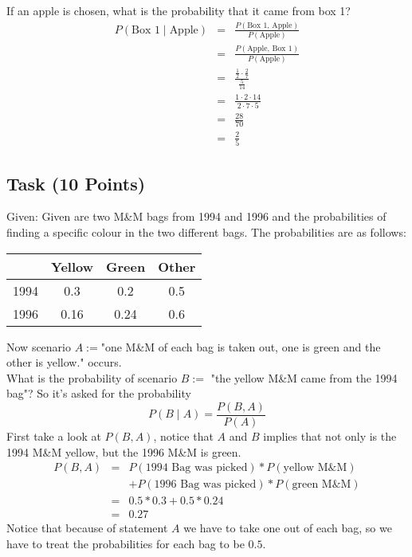 \documentclass{article}
\begin{document}
	If an apple is chosen, what is the probability that it came from box 1?\\
	\begin{eqnarray*}
		P(\text{Box 1} \mid \text{Apple}) &=& \frac{P(\text{Box 1, Apple})}{P(\text{Apple})}\\
		&=& \frac{P(\text{Apple, Box 1})}{P(\text{Apple})}\\
		&=& \frac{\frac{1}{2} \cdot \frac{2}{7}}{\frac{5}{14}}\\
		&=& \frac{1 \cdot 2 \cdot 14}{2 \cdot 7 \cdot 5}\\
		&=& \frac{28}{70}\\
		&=& \frac{2}{5}
	\end{eqnarray*}

	\subsection{Task (10 Points)}
	Given: Given are two M\&M bags from 1994 and 1996 and the probabilities of finding a specific colour in the two different bags. The probabilities are as follows:
	\begin{center}
		\begin{tabular}{ |c|c|c|c| }
			\hline
			& Yellow & Green & Other \\ 
			\hline
			1994 & 0.3 & 0.2 & 0.5 \\ 
			\hline
			1996 & 0.16 & 0.24 & 0.6 \\ 
			\hline
		\end{tabular}
	\end{center}
	Now scenario $A := $"one M\&M of each bag is taken out, one is green and the other is yellow." occurs.\\
	What is the probability of scenario $B := $ "the yellow M\&M came from the 1994 bag"?
	So it's asked for the probability 
	\begin{equation*}
		P(B \mid A) = \frac{P(B, A)}{P(A)}
	\end{equation*}
	First take a look at $P(B, A)$, notice that $A$ and $B$ implies that not only is the 1994 M\&M yellow, but the 1996 M\&M is green.
	\begin{eqnarray*}
		P(B, A) &=& P(\text{1994 Bag was picked}) * P(\text{yellow M\&M})\\
		&&+ P(\text{1996 Bag was picked}) * P(\text{green M\&M})\\
		&=& 0.5 * 0.3 + 0.5 * 0.24\\
		&=& 0.27
	\end{eqnarray*}
	Notice that because of statement $A$ we have to take one out of each bag, so we have to treat the probabilities for each bag to be $0.5$.
\end{document}

